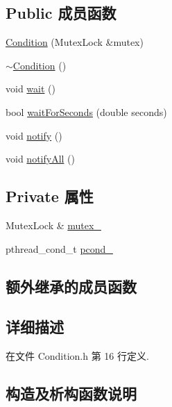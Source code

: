 \subsection*{Public 成员函数}
\begin{DoxyCompactItemize}
\item 
\hyperlink{classmuduo_1_1Condition_a001aec23fe5b8a6bc3b6ec4b6b895142}{Condition} (Mutex\+Lock \&mutex)
\item 
\hyperlink{classmuduo_1_1Condition_a4fdcd7a3b5f12ae38bd90bb95adf8388}{$\sim$\+Condition} ()
\item 
void \hyperlink{classmuduo_1_1Condition_aa3b21853f890838c88d047d6c2786917}{wait} ()
\item 
bool \hyperlink{classmuduo_1_1Condition_a73adc43213ab6f784ca7c47923907ac2}{wait\+For\+Seconds} (double seconds)
\item 
void \hyperlink{classmuduo_1_1Condition_a7ff19734eb024bd6f3e2ad95647b1b27}{notify} ()
\item 
void \hyperlink{classmuduo_1_1Condition_ae01f53e9933a1e6e4742d8d889ead690}{notify\+All} ()
\end{DoxyCompactItemize}
\subsection*{Private 属性}
\begin{DoxyCompactItemize}
\item 
Mutex\+Lock \& \hyperlink{classmuduo_1_1Condition_a06a4780af4c6dd060869c14027ee8055}{mutex\+\_\+}
\item 
pthread\+\_\+cond\+\_\+t \hyperlink{classmuduo_1_1Condition_a092da37dcd38b596795e369da99d2b82}{pcond\+\_\+}
\end{DoxyCompactItemize}
\subsection*{额外继承的成员函数}


\subsection{详细描述}


在文件 Condition.\+h 第 16 行定义.



\subsection{构造及析构函数说明}
\mbox{\label{classmuduo_1_1Condition_a001aec23fe5b8a6bc3b6ec4b6b895142}} 
